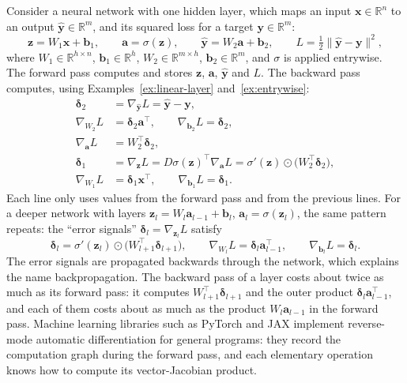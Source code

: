 \documentclass[11pt]{article}
\newcommand{\norm}[1]{\lVert #1 \rVert}
\theoremstyle{definition}
\theoremstyle{plain}
\theoremstyle{remark}
\begin{document}
Consider a neural network with one hidden layer, which maps an input $\mathbf{x} \in \mathbb{R}^n$ to an output $\hat{\mathbf{y}} \in \mathbb{R}^m$, and its squared loss for a target $\mathbf{y} \in \mathbb{R}^m$:
\[\mathbf{z} = W_1 \mathbf{x} + \mathbf{b}_1, \qquad \mathbf{a} = \sigma(\mathbf{z}), \qquad \hat{\mathbf{y}} = W_2 \mathbf{a} + \mathbf{b}_2, \qquad L = \tfrac{1}{2}\norm{\hat{\mathbf{y}} - \mathbf{y}}^2,\]
where $W_1 \in \mathbb{R}^{h \times n}$, $\mathbf{b}_1 \in \mathbb{R}^h$, $W_2 \in \mathbb{R}^{m \times h}$, $\mathbf{b}_2 \in \mathbb{R}^m$, and $\sigma$ is applied entrywise. The forward pass computes and stores $\mathbf{z}$, $\mathbf{a}$, $\hat{\mathbf{y}}$ and $L$. The backward pass computes, using Examples~\ref{ex:linear-layer} and~\ref{ex:entrywise}:
\begin{align*}
    \boldsymbol{\delta}_2 &= \nabla_{\hat{\mathbf{y}}} L = \hat{\mathbf{y}} - \mathbf{y}, \\
    \nabla_{W_2} L &= \boldsymbol{\delta}_2 \mathbf{a}^\top, \qquad \nabla_{\mathbf{b}_2} L = \boldsymbol{\delta}_2, \\
    \nabla_{\mathbf{a}} L &= W_2^\top \boldsymbol{\delta}_2, \\
    \boldsymbol{\delta}_1 &= \nabla_{\mathbf{z}} L = D\sigma(\mathbf{z})^\top \nabla_{\mathbf{a}} L = \sigma'(\mathbf{z}) \odot \big(W_2^\top \boldsymbol{\delta}_2\big), \\
    \nabla_{W_1} L &= \boldsymbol{\delta}_1 \mathbf{x}^\top, \qquad \nabla_{\mathbf{b}_1} L = \boldsymbol{\delta}_1.
\end{align*}
Each line only uses values from the forward pass and from the previous lines. For a deeper network with layers $\mathbf{z}_l = W_l \mathbf{a}_{l-1} + \mathbf{b}_l$, $\mathbf{a}_l = \sigma(\mathbf{z}_l)$, the same pattern repeats: the ``error signals'' $\boldsymbol{\delta}_l = \nabla_{\mathbf{z}_l} L$ satisfy
\[\boldsymbol{\delta}_l = \sigma'(\mathbf{z}_l) \odot \big(W_{l+1}^\top \boldsymbol{\delta}_{l+1}\big), \qquad \nabla_{W_l} L = \boldsymbol{\delta}_l \mathbf{a}_{l-1}^\top, \qquad \nabla_{\mathbf{b}_l} L = \boldsymbol{\delta}_l.\]
The error signals are propagated backwards through the network, which explains the name backpropagation. The backward pass of a layer costs about twice as much as its forward pass: it computes $W_{l+1}^\top\boldsymbol{\delta}_{l+1}$ and the outer product $\boldsymbol{\delta}_l\mathbf{a}_{l-1}^\top$, and each of them costs about as much as the product $W_l\mathbf{a}_{l-1}$ in the forward pass. Machine learning libraries such as PyTorch and JAX implement reverse-mode automatic differentiation for general programs: they record the computation graph during the forward pass, and each elementary operation knows how to compute its vector-Jacobian product.
\end{document}

